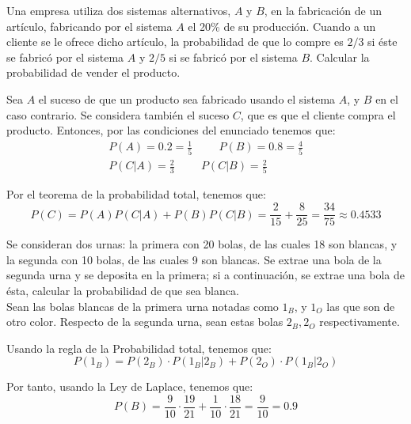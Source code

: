 \begin{ejercicio} \label{ej:4.Ejercicio5}
    Una empresa utiliza dos sistemas alternativos, $A$ y $B$, en la fabricación de un artículo, fabricando por el sistema $A$ el 20\% de su producción. Cuando a un cliente se le ofrece dicho artículo, la probabilidad de que lo compre es $2/3$ si éste se fabricó por el sistema $A$ y $2/5$ si se fabricó por el sistema $B$. Calcular la probabilidad de vender el producto.

    Sea $A$ el suceso de que un producto sea fabricado usando el sistema $A$, y $B$ en el caso contrario. Se considera también el suceso $C$, que es que el cliente compra el producto. Entonces, por las condiciones del enunciado tenemos que:
    \begin{gather*}
        P(A)=0.2 = \frac{1}{5} \hspace{1cm} P(B)=0.8 = \frac{4}{5} \\
        P(C|A) = \frac{2}{3} \hspace{1cm} P(C|B) = \frac{2}{5}
    \end{gather*}

    Por el teorema de la probabilidad total, tenemos que:
    \begin{equation*}
        P(C) = P(A)P(C|A) + P(B)P(C|B) = \frac{2}{15} + \frac{8}{25} = \frac{34}{75} \approx 0.4533
    \end{equation*}
\end{ejercicio}

\begin{ejercicio} \label{ej:4.Ejercicio6}
    Se consideran dos urnas: la primera con 20 bolas, de las cuales 18 son blancas, y la segunda con 10 bolas, de las cuales 9 son blancas. Se extrae una bola de la segunda urna y se deposita en la primera; si a continuación, se extrae una bola de ésta, calcular la probabilidad de que sea blanca.\\

    Sean las bolas blancas de la primera urna notadas como $1_B$, y $1_O$ las que son de otro color. Respecto de la segunda urna, sean estas bolas $2_B,2_O$ respectivamente.

    Usando la regla de la Probabilidad total, tenemos que:
    \begin{equation*}
        P(1_B) = P(2_B)\cdot P(1_B|2_B) + P(2_O)\cdot P(1_B|2_O)
    \end{equation*}

    Por tanto, usando la Ley de Laplace, tenemos que:
    \begin{equation*}
        P(B) = \frac{9}{10}\cdot \frac{19}{21} + \frac{1}{10}\cdot \frac{18}{21} = \frac{9}{10} = 0.9
    \end{equation*}
\end{ejercicio}

